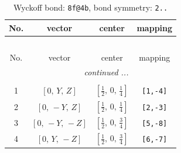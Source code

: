 \documentclass[fleqn,8pt]{jsarticle}
\begin{document}
\renewcommand{\arraystretch}{1.2}
\begin{longtable}{cccc}
\caption{Wyckoff bond: {\tt 8f@4b}, bond symmetry: {\tt 2..}}
 \\
 \hline \hline
No. & vector & center & mapping \\ \hline \endfirsthead

\multicolumn{3}{l}{\tablename\ \thetable{}} \\
 \hline \hline
No. & vector & center & mapping \\ \hline \endhead

 \hline \hline
\multicolumn{3}{r}{\footnotesize\it continued ...} \\ \endfoot

 \hline \hline
\multicolumn{3}{r}{} \\ \endlastfoot

1 & $\left[ 0,\, Y,\, Z \right]$ & $\left[ \frac{1}{2},\, 0,\, \frac{1}{4} \right]$ & {\tt [1,-4]} \\ \hline
2 & $\left[ 0,\, - Y,\, Z \right]$ & $\left[ \frac{1}{2},\, 0,\, \frac{1}{4} \right]$ & {\tt [2,-3]} \\ \hline
3 & $\left[ 0,\, - Y,\, - Z \right]$ & $\left[ \frac{1}{2},\, 0,\, \frac{3}{4} \right]$ & {\tt [5,-8]} \\ \hline
4 & $\left[ 0,\, Y,\, - Z \right]$ & $\left[ \frac{1}{2},\, 0,\, \frac{3}{4} \right]$ & {\tt [6,-7]} \\
\end{longtable}
\renewcommand{\arraystretch}{1.2}
\end{document}
